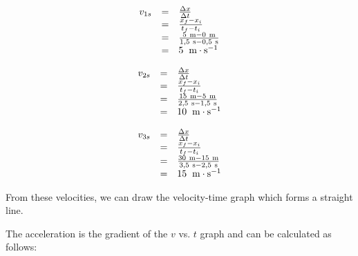     \begin{equation*}
    \begin{array}{ccc}\hfill {v}_{1s}& =& \frac{\Delta x}{\Delta t}\hfill \\ & =& \frac{{x}_{f}-{x}_{i}}{{t}_{f}-{t}_{i}}\hfill \\ & =& \frac{5\phantom{\rule{3.33333pt}{0ex}}\text{m}-0\phantom{\rule{3.33333pt}{0ex}}\text{m}}{1,5\phantom{\rule{3.33333pt}{0ex}}\text{s}-0,5\phantom{\rule{3.33333pt}{0ex}}\text{s}}\hfill \\ & =& 5\phantom{\rule{4pt}{0ex}}\phantom{\rule{0.166667em}{0ex}}\text{m}\ensuremath{\cdot}{\text{s}}^{-1}\hfill \end{array}
      \end{equation*}
          \label{m38795*id72062}\nopagebreak\noindent{}
            
    \begin{equation*}
    \begin{array}{ccc}\hfill {v}_{2s}& =& \frac{\Delta x}{\Delta t}\hfill \\ & =& \frac{{x}_{f}-{x}_{i}}{{t}_{f}-{t}_{i}}\hfill \\ & =& \frac{15\phantom{\rule{3.33333pt}{0ex}}\text{m}-5\phantom{\rule{3.33333pt}{0ex}}\text{m}}{2,5\phantom{\rule{3.33333pt}{0ex}}\text{s}-1,5\phantom{\rule{3.33333pt}{0ex}}\text{s}}\hfill \\ & =& 10\phantom{\rule{4pt}{0ex}}\phantom{\rule{0.166667em}{0ex}}\text{m}\ensuremath{\cdot}{\text{s}}^{-1}\hfill \end{array}
      \end{equation*}
          \label{m38795*id72272}\nopagebreak\noindent{}
            
    \begin{equation*}
    \begin{array}{ccc}\hfill {v}_{3s}& =& \frac{\Delta x}{\Delta t}\hfill \\ & =& \frac{{x}_{f}-{x}_{i}}{{t}_{f}-{t}_{i}}\hfill \\ & =& \frac{30\phantom{\rule{3.33333pt}{0ex}}\text{m}-15\phantom{\rule{3.33333pt}{0ex}}\text{m}}{3,5\phantom{\rule{3.33333pt}{0ex}}\text{s}-2,5\phantom{\rule{3.33333pt}{0ex}}\text{s}}\hfill \\ & =& 15\phantom{\rule{4pt}{0ex}}\phantom{\rule{0.166667em}{0ex}}\text{m}\ensuremath{\cdot}{\text{s}}^{-1}\hfill \end{array}
      \end{equation*}
        \par 
        \label{m38795*id72478}From these velocities, we can draw the velocity-time graph which forms a straight line.\par 
        \label{m38795*id72482}The acceleration is the gradient of the $v$ vs. $t$ graph and can be calculated as follows:\par 
        \label{m38795*id72504}\nopagebreak\noindent{}
          
